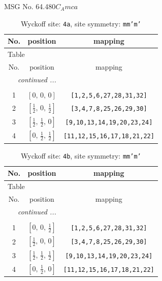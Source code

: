 \documentclass[fleqn,8pt]{jsarticle}
\begin{document}
\setcounter{MaxMatrixCols}{32}

\renewcommand{\tablename}{Table~}
\renewcommand{\figurename}{Figure~}
\begin{center}
\LARGE
MSG No. 64.480\quad$C_{A}mca$
\end{center}
\renewcommand{\arraystretch}{1.2}
\begin{longtable}{ccc}
\caption{Wyckoff site: {\tt 4a}, site symmetry: {\tt mm'm'}}
 \\
 \hline \hline
No. & position & mapping \\ \hline \endfirsthead

\multicolumn{2}{l}{\tablename\ \thetable{}} \\
 \hline \hline
No. & position & mapping \\ \hline \endhead

 \hline \hline
\multicolumn{2}{r}{\footnotesize\it continued ...} \\ \endfoot

 \hline \hline
\multicolumn{2}{r}{} \\ \endlastfoot

1 & $\left[ 0,\, 0,\, 0 \right]$ & {\tt [1,2,5,6,27,28,31,32]} \\ \hline
2 & $\left[ \frac{1}{2},\, 0,\, \frac{1}{2} \right]$ & {\tt [3,4,7,8,25,26,29,30]} \\ \hline
3 & $\left[ \frac{1}{2},\, \frac{1}{2},\, 0 \right]$ & {\tt [9,10,13,14,19,20,23,24]} \\ \hline
4 & $\left[ 0,\, \frac{1}{2},\, \frac{1}{2} \right]$ & {\tt [11,12,15,16,17,18,21,22]} \\
\end{longtable}
\renewcommand{\arraystretch}{1.2}
\begin{longtable}{ccc}
\caption{Wyckoff site: {\tt 4b}, site symmetry: {\tt mm'm'}}
 \\
 \hline \hline
No. & position & mapping \\ \hline \endfirsthead

\multicolumn{2}{l}{\tablename\ \thetable{}} \\
 \hline \hline
No. & position & mapping \\ \hline \endhead

 \hline \hline
\multicolumn{2}{r}{\footnotesize\it continued ...} \\ \endfoot

 \hline \hline
\multicolumn{2}{r}{} \\ \endlastfoot

1 & $\left[ 0,\, 0,\, \frac{1}{2} \right]$ & {\tt [1,2,5,6,27,28,31,32]} \\ \hline
2 & $\left[ \frac{1}{2},\, 0,\, 0 \right]$ & {\tt [3,4,7,8,25,26,29,30]} \\ \hline
3 & $\left[ \frac{1}{2},\, \frac{1}{2},\, \frac{1}{2} \right]$ & {\tt [9,10,13,14,19,20,23,24]} \\ \hline
4 & $\left[ 0,\, \frac{1}{2},\, 0 \right]$ & {\tt [11,12,15,16,17,18,21,22]} \\
\end{longtable}
\end{document}
